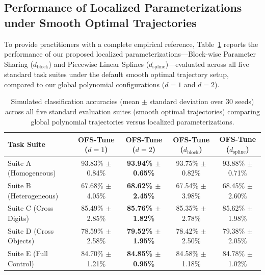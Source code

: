 \subsection{Performance of Localized Parameterizations under Smooth Optimal Trajectories}
\label{subsec:smooth_localized}

To provide practitioners with a complete empirical reference, Table~\ref{tab:smooth_localized} reports the performance of our proposed localized parameterizations---Block-wise Parameter Sharing ($d_{\text{block}}$) and Piecewise Linear Splines ($d_{\text{spline}}$)---evaluated across all five standard task suites under the default smooth optimal trajectory setup, compared to our global polynomial configurations ($d=1$ and $d=2$).

\begin{table}[t]
\caption{Simulated classification accuracies (mean $\pm$ standard deviation over 30 seeds) across all five standard evaluation suites (smooth optimal trajectories) comparing global polynomial trajectories versus localized parameterizations.}
\label{tab:smooth_localized}
\vskip 0.1in
\begin{center}
\begin{small}
\begin{sc}
\begin{tabular}{lcccc}
\toprule
Task Suite & OFS-Tune ($d=1$) & OFS-Tune ($d=2$) & OFS-Tune ($d_{\text{block}}$) & OFS-Tune ($d_{\text{spline}}$) \\
\midrule
Suite A (Homogeneous) & 93.83\% $\pm$ 0.84\% & \textbf{93.94\% $\pm$ 0.65\%} & 93.75\% $\pm$ 0.82\% & 93.88\% $\pm$ 0.71\% \\
Suite B (Heterogeneous) & 67.68\% $\pm$ 4.05\% & \textbf{68.62\% $\pm$ 2.45\%} & 67.54\% $\pm$ 3.98\% & 68.45\% $\pm$ 2.60\% \\
Suite C (Cross Digits) & 85.49\% $\pm$ 2.85\% & \textbf{85.76\% $\pm$ 1.82\%} & 85.35\% $\pm$ 2.78\% & 85.62\% $\pm$ 1.98\% \\
Suite D (Cross Objects) & 78.59\% $\pm$ 2.58\% & \textbf{79.52\% $\pm$ 1.95\%} & 78.42\% $\pm$ 2.50\% & 79.38\% $\pm$ 2.05\% \\
Suite E (Full Control) & 84.70\% $\pm$ 1.21\% & \textbf{84.85\% $\pm$ 0.95\%} & 84.58\% $\pm$ 1.18\% & 84.78\% $\pm$ 1.02\% \\
\bottomrule
\end{tabular}
\end{sc}
\end{small}
\end{center}
\vskip -0.1in
\end{table}


